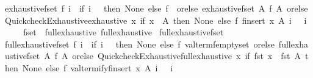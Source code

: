 \begin{isabellebody}
{\isachardoublequoteopen}exhaustive{\isacharunderscore}fset\ f\ i\ {\isacharequal}\ {\isacharparenleft}if\ i\ {\isacharequal}\ {}\ then\ None\ else\ {\isacharparenleft}f\ {\isacharbraceleft}{\isacharbar}{\isacharbar}{\isacharbraceright}\ orelse\ exhaustive{\isacharunderscore}fset\ {\isacharparenleft}{\isasymlambda}A{\isachardot}\ f\ A\ orelse\ Quickcheck{\isacharunderscore}Exhaustive{\isachardot}exhaustive\ {\isacharparenleft}{\isasymlambda}x{\isachardot}\ if\ x\ {\isacharbar}{\isasymin}{\isacharbar}\ A\ then\ None\ else\ f\ {\isacharparenleft}finsert\ x\ A{\isacharparenright}{\isacharparenright}\ {\isacharparenleft}i\ {\isacharminus}\ {}{\isacharparenright}{\isacharparenright}\ {\isacharparenleft}i\ {\isacharminus}\ {}{\isacharparenright}{\isacharparenright}{\isacharparenright}{\isachardoublequoteclose}\isanewline
\isanewline
{}\isamarkupfalse%
%
\isadelimproof
\ %
\endisadelimproof
%
\isatagproof
\isacommand{{\isachardot}{\isachardot}}\isamarkupfalse%
%
\endisatagproof
{\isafoldproof}%
%
\isadelimproof
%
\endisadelimproof
\isanewline
\isanewline
{}\isamarkupfalse%
\isanewline
\isanewline
{}\isamarkupfalse%
\ fset\ {\isacharcolon}{\isacharcolon}\ {\isacharparenleft}full{\isacharunderscore}exhaustive{\isacharparenright}\ full{\isacharunderscore}exhaustive\isanewline
{}\isanewline
\isanewline
{}\isamarkupfalse%
\ full{\isacharunderscore}exhaustive{\isacharunderscore}fset\ \isanewline
{\isachardoublequoteopen}full{\isacharunderscore}exhaustive{\isacharunderscore}fset\ f\ i\ {\isacharequal}\ {\isacharparenleft}if\ i\ {\isacharequal}\ {}\ then\ None\ else\ {\isacharparenleft}f\ valterm{\isacharunderscore}femptyset\ orelse\ full{\isacharunderscore}exhaustive{\isacharunderscore}fset\ {\isacharparenleft}{\isasymlambda}A{\isachardot}\ f\ A\ orelse\ Quickcheck{\isacharunderscore}Exhaustive{\isachardot}full{\isacharunderscore}exhaustive\ {\isacharparenleft}{\isasymlambda}x{\isachardot}\ if\ fst\ x\ {\isacharbar}{\isasymin}{\isacharbar}\ fst\ A\ then\ None\ else\ f\ {\isacharparenleft}valtermify{\isacharunderscore}finsert\ x\ A{\isacharparenright}{\isacharparenright}\ {\isacharparenleft}i\ {\isacharminus}\ {}{\isacharparenright}{\isacharparenright}\ {\isacharparenleft}i\ {\isacharminus}\ {}{\isacharparenright}{\isacharparenright}{\isacharparenright}{\isachardoublequoteclose}\isanewline
\isanewline
{}\isamarkupfalse%
%
\isadelimproof
\ %
\endisadelimproof
%
\isatagproof
\isacommand{{\isachardot}{\isachardot}}\isamarkupfalse%

\end{isabellebody}
